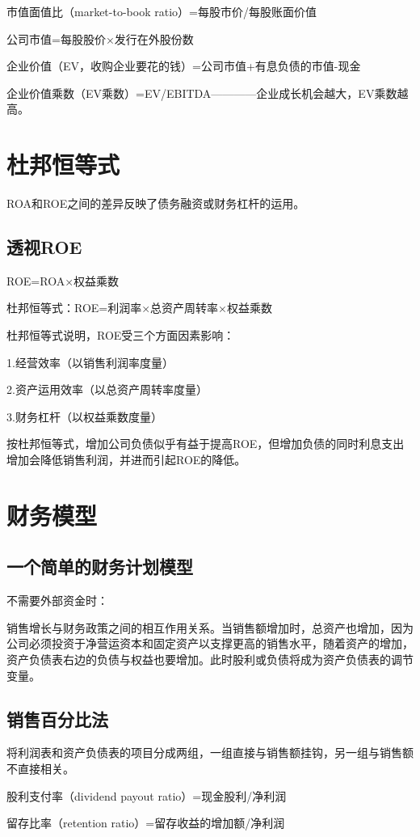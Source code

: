 \documentclass{article}
\begin{document}
市值面值比（market-to-book ratio）=每股市价/每股账面价值

公司市值=每股股价×发行在外股份数

企业价值（EV，收购企业要花的钱）=公司市值+有息负债的市值-现金

企业价值乘数（EV乘数）=EV/EBITDA————企业成长机会越大，EV乘数越高。

\section{杜邦恒等式}
ROA和ROE之间的差异反映了债务融资或财务杠杆的运用。
\subsection{透视ROE}
ROE=ROA×权益乘数

杜邦恒等式：ROE=利润率×总资产周转率×权益乘数

杜邦恒等式说明，ROE受三个方面因素影响：

1.经营效率（以销售利润率度量）

2.资产运用效率（以总资产周转率度量）

3.财务杠杆（以权益乘数度量）

按杜邦恒等式，增加公司负债似乎有益于提高ROE，但增加负债的同时利息支出增加会降低销售利润，并进而引起ROE的降低。

\section{财务模型}
\subsection{一个简单的财务计划模型}
不需要外部资金时：

销售增长与财务政策之间的相互作用关系。当销售额增加时，总资产也增加，因为公司必须投资于净营运资本和固定资产以支撑更高的销售水平，随着资产的增加，资产负债表右边的负债与权益也要增加。此时股利或负债将成为资产负债表的调节变量。
\subsection{销售百分比法}
将利润表和资产负债表的项目分成两组，一组直接与销售额挂钩，另一组与销售额不直接相关。

\hspace*{\fill}

股利支付率（dividend payout ratio）=现金股利/净利润

留存比率（retention ratio）=留存收益的增加额/净利润
\end{document}

